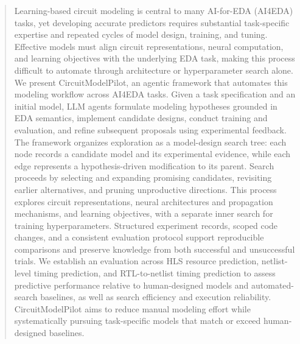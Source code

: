 \begin{abstract}
Learning-based circuit modeling is central to many AI-for-EDA (AI4EDA) tasks, yet developing accurate predictors requires substantial task-specific expertise and repeated cycles of model design, training, and tuning. Effective models must align circuit representations, neural computation, and learning objectives with the underlying EDA task, making this process difficult to automate through architecture or hyperparameter search alone. We present CircuitModelPilot, an agentic framework that automates this modeling workflow across AI4EDA tasks. Given a task specification and an initial model, LLM agents formulate modeling hypotheses grounded in EDA semantics, implement candidate designs, conduct training and evaluation, and refine subsequent proposals using experimental feedback. The framework organizes exploration as a model-design search tree: each node records a candidate model and its experimental evidence, while each edge represents a hypothesis-driven modification to its parent. Search proceeds by selecting and expanding promising candidates, revisiting earlier alternatives, and pruning unproductive directions. This process explores circuit representations, neural architectures and propagation mechanisms, and learning objectives, with a separate inner search for training hyperparameters. Structured experiment records, scoped code changes, and a consistent evaluation protocol support reproducible comparisons and preserve knowledge from both successful and unsuccessful trials. We establish an evaluation across HLS resource prediction, netlist-level timing prediction, and RTL-to-netlist timing prediction to assess predictive performance relative to human-designed models and automated-search baselines, as well as search efficiency and execution reliability. CircuitModelPilot aims to reduce manual modeling effort while systematically pursuing task-specific models that match or exceed human-designed baselines.
\end{abstract}

